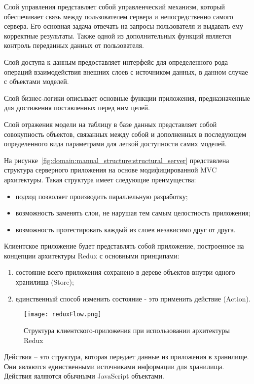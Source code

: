 Слой управления представляет собой управленческий механизм, который обеспечивает связь между пользователем сервера и непосредственно самого сервера. Его основная задача отвечать на запросы пользователя и выдавать ему корректные результаты. Также одной из дополнительных функций является контроль переданных данных от пользователя.

Слой доступа к данным предоставляет интерфейс для определенного рода операций взаимодействия внешних слоев с источником данных, в данном случае с объектами моделей.

Слой бизнес-логики описывает основные функции приложения, предназначенные для достижения поставленных перед ним целей.

Слой отражения модели на таблицу в базе данных представляет собой совокупность объектов, связанных между собой и дополненных в последующем определенного вида параметрами для легкой доступности самих моделей.

На рисунке~\ref{fig:domain:manual_structure:structural_server} представлена структура серверного приложения на основе модифицированной MVC архитектуры. Такая структура имеет следующие преимущества:
\begin{itemize}
  \item подход позволяет производить параллельную разработку;
  \item возможность заменять слои, не нарушая тем самым целостность приложения;
  \item возможность протестировать каждый из слоев независимо друг от друга.
\end{itemize}

Клиентское приложение будет представлять собой приложение, построенное на концепции архитектуры Redux с основными принципами:
\begin{enumerate}
  \item состояние всего приложения сохранено в дереве объектов внутри одного хранилища (Store);
  \item единственный способ изменить состояние - это применить действие (Action).
\end{enumerate}

\begin{figure}[ht]
\centering
  \texttt{[image: reduxFlow.png]}  
  \caption{Структура клиентского-приложения при использовании архитектуры Redux}
  \label{fig:domain:manual_structure:structural_client}
\end{figure}

Действия -- это структура, которая передает данные из приложения в хранилище. Они являются единственными источниками информации для хранилища. Действия яаляются обычными JavaScript объектами.

